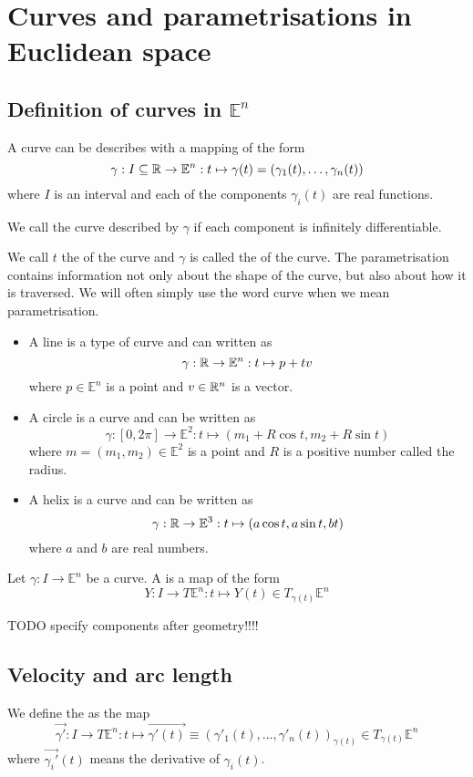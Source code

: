 \section{Curves and parametrisations in Euclidean space}
\subsection{Definition of curves in $\mathbb{E}^n$}
A curve can be describes with a mapping of the form
\[ \gamma: I\subseteq \mathbb{R} \to \mathbb{E}^n: t \mapsto \gamma(t) = (\gamma_1(t), \ldots, \gamma_n(t)) \]
where $I$ is an interval and each of the components $\gamma_i(t)$ are real functions.

We call the curve described by $\gamma$  if each component is infinitely differentiable.

We call $t$ the  of the curve and $\gamma$ is called the  of the curve. The parametrisation contains information not only about the shape of the curve, but also about how it is traversed. We will often simply use the word curve when we mean parametrisation.

\begin{example}
\begin{itemize}
\item A line is a type of curve and can written as
\[ \gamma: \mathbb{R} \to \mathbb{E}^n: t \mapsto p + tv \]
where $p\in \mathbb{E}^n$ is a point and $v\in \mathbb{R}^n$ is a vector.
\item A circle is a curve and can be written as
\[ \gamma: [0,2\pi]\to \mathbb{E}^2: t\mapsto (m_1 + R\cos t, m_2 + R\sin t) \]
where $m = (m_1,m_2) \in \mathbb{E}^2$ is a point and $R$ is a positive number called the radius.
\item A helix is a curve and can be written as
\[ \gamma: \mathbb{R}\to \mathbb{E}^3: t\mapsto (a\cos t, a\sin t, bt) \]
where $a$ and $b$ are real numbers.
\end{itemize}
\end{example}

\begin{definition}
Let $\gamma: I \to \mathbb{E}^n$ be a curve. A  is a map of the form
\[ Y: I \to T\mathbb{E}^n: t\mapsto Y(t) \in T_{\gamma(t)}\mathbb{E}^n \]
\end{definition}

TODO specify components after geometry!!!!

\subsection{Velocity and arc length}
We define the  as the map
\[ \vec{\gamma'}: I \to T\mathbb{E}^n: t \mapsto \vec{\gamma'(t)}\equiv (\gamma'_1(t),\ldots, \gamma'_n(t))_{\gamma(t)} \in T_{\gamma(t)}\mathbb{E}^n \]
where $\vec{\gamma_i'}(t)$ means the derivative of $\gamma_i(t)$.

